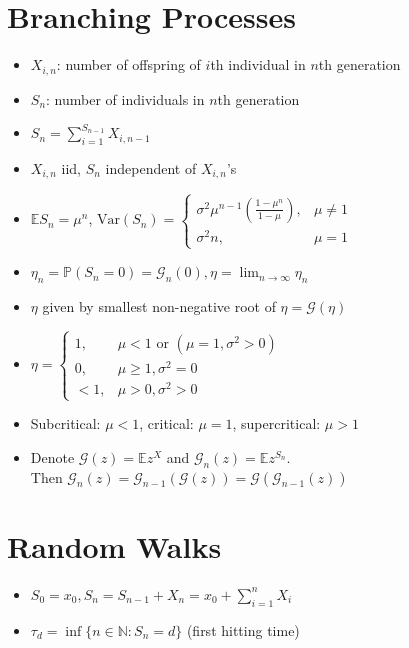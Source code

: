



\section{Branching Processes}
\begin{itemize}
    \item $X_{i,n}$: number of offspring of $i$th individual in $n$th generation
    \item $S_n$: number of individuals in $n$th generation
    \item $S_n = \sum_{i=1}^{S_{n-1}}X_{i,n-1}$
    \item $X_{i,n}$ iid, $S_n$ independent of $X_{i,n}$'s
    \item $\mathbb{E}S_n = \mu^n$, $\text{Var}(S_n) = \begin{cases}
        \sigma^2\mu^{n-1} \left(\frac{1 - \mu^n}{1 - \mu}\right), & \mu \neq 1 \\
        \sigma^2n, & \mu = 1
    \end{cases}$
    \item $\eta_n = \mathbb{P}(S_n = 0) = \mathcal{G}_n(0), \eta = \displaystyle\lim_{n\to\infty} \eta_n$
    \item $\eta$ given by smallest non-negative root of $\eta = \mathcal{G}(\eta)$
    \item $\eta = \begin{cases}
        1, & \mu < 1 \text{ or } (\mu = 1, \sigma^2 > 0) \\
        0, & \mu \geq 1, \sigma^2 = 0 \\
        < 1, & \mu > 0, \sigma^2 > 0
    \end{cases}$
    \item Subcritical: $\mu < 1$, critical: $\mu = 1$, supercritical: $\mu > 1$
    \item Denote $\mathcal{G}(z) = \mathbb{E}z^X$ and $\mathcal{G}_n(z) = \mathbb{E}z^{S_n}$. \\ Then $\mathcal{G}_n(z) = \mathcal{G}_{n-1}(\mathcal{G}(z)) = \mathcal{G}(\mathcal{G}_{n-1}(z))$
\end{itemize}

\section{Random Walks}
\begin{itemize}
    \item $S_0 = x_0, S_n = S_{n-1} + X_n = x_0 + \sum_{i=1}^n X_i$
    \item $\tau_d = \inf\{n \in \mathbb{N} : S_n = d\}$ (first hitting time)
\end{itemize}

